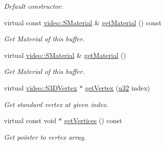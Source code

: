 \begin{DoxyCompactItemize}
\begin{DoxyCompactList}\small\item\em Default constructor. \end{DoxyCompactList}\item 
\mbox{\label{structirr_1_1scene_1_1SSkinMeshBuffer_a0ba6d4da9bbb92c5aa9c7c70225d3eb6}} 
virtual const \hyperlink{classirr_1_1video_1_1SMaterial}{video\+::\+S\+Material} \& \hyperlink{structirr_1_1scene_1_1SSkinMeshBuffer_a0ba6d4da9bbb92c5aa9c7c70225d3eb6}{get\+Material} () const
\begin{DoxyCompactList}\small\item\em Get Material of this buffer. \end{DoxyCompactList}\item 
\mbox{\label{structirr_1_1scene_1_1SSkinMeshBuffer_a5e4a6cc69dac5ac75d43d8e89a23da2b}} 
virtual \hyperlink{classirr_1_1video_1_1SMaterial}{video\+::\+S\+Material} \& \hyperlink{structirr_1_1scene_1_1SSkinMeshBuffer_a5e4a6cc69dac5ac75d43d8e89a23da2b}{get\+Material} ()
\begin{DoxyCompactList}\small\item\em Get Material of this buffer. \end{DoxyCompactList}\item 
\mbox{\label{structirr_1_1scene_1_1SSkinMeshBuffer_a3773a0f0d5995080960d9d098f9f051e}} 
virtual \hyperlink{structirr_1_1video_1_1S3DVertex}{video\+::\+S3\+D\+Vertex} $\ast$ \hyperlink{structirr_1_1scene_1_1SSkinMeshBuffer_a3773a0f0d5995080960d9d098f9f051e}{get\+Vertex} (\hyperlink{namespaceirr_a0416a53257075833e7002efd0a18e804}{u32} index)
\begin{DoxyCompactList}\small\item\em Get standard vertex at given index. \end{DoxyCompactList}\item 
\mbox{\label{structirr_1_1scene_1_1SSkinMeshBuffer_a61271053674a773fd4afcdffafddf9b3}} 
virtual const void $\ast$ \hyperlink{structirr_1_1scene_1_1SSkinMeshBuffer_a61271053674a773fd4afcdffafddf9b3}{get\+Vertices} () const
\begin{DoxyCompactList}\small\item\em Get pointer to vertex array. \end{DoxyCompactList}\item 

\end{DoxyCompactItemize}
